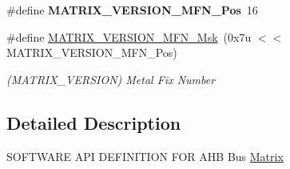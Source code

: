 \begin{DoxyCompactItemize}
\#define {\bfseries M\+A\+T\+R\+I\+X\+\_\+\+V\+E\+R\+S\+I\+O\+N\+\_\+\+M\+F\+N\+\_\+\+Pos}~16
\item 
\mbox{\label{group__SAMV71__MATRIX_gab42e223f2c322624d28582f40ca867ec}} 
\#define \mbox{\hyperlink{group__SAMV71__MATRIX_gab42e223f2c322624d28582f40ca867ec}{M\+A\+T\+R\+I\+X\+\_\+\+V\+E\+R\+S\+I\+O\+N\+\_\+\+M\+F\+N\+\_\+\+Msk}}~(0x7u $<$$<$ M\+A\+T\+R\+I\+X\+\_\+\+V\+E\+R\+S\+I\+O\+N\+\_\+\+M\+F\+N\+\_\+\+Pos)
\begin{DoxyCompactList}\small\item\em (M\+A\+T\+R\+I\+X\+\_\+\+V\+E\+R\+S\+I\+ON) Metal Fix Number \end{DoxyCompactList}\end{DoxyCompactItemize}


\subsection{Detailed Description}
S\+O\+F\+T\+W\+A\+RE A\+PI D\+E\+F\+I\+N\+I\+T\+I\+ON F\+OR A\+HB Bus \mbox{\hyperlink{structMatrix}{Matrix}} 